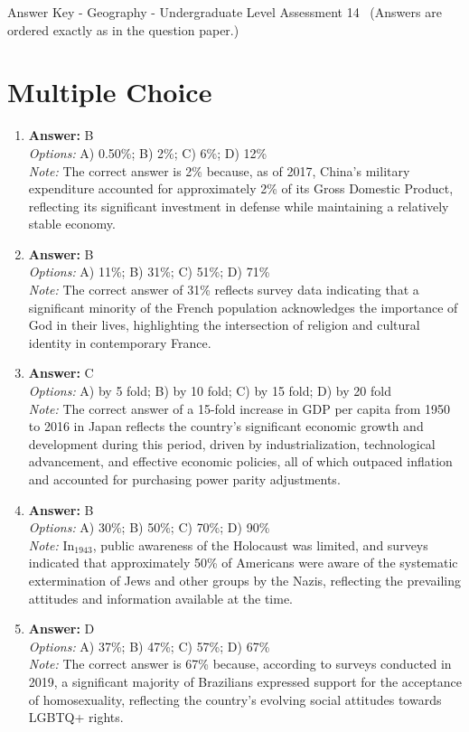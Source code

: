 \documentclass[12pt]{article}
\begin{document}
\begin{center}
Answer Key - Geography - Undergraduate Level Assessment 14 \
\small (Answers are ordered exactly as in the question paper.)
\end{center}

\section*{Multiple Choice}
\begin{enumerate}[label=\arabic*.]
\item \textbf{Answer:} B
\\ \textit{Options:} A) 0.50\%; B) 2\%; C) 6\%; D) 12\%
\\ \textit{Note:} The correct answer is 2\% because, as of 2017, China's military expenditure accounted for approximately 2\% of its Gross Domestic Product, reflecting its significant investment in defense while maintaining a relatively stable economy.
\item \textbf{Answer:} B
\\ \textit{Options:} A) 11\%; B) 31\%; C) 51\%; D) 71\%
\\ \textit{Note:} The correct answer of 31\% reflects survey data indicating that a significant minority of the French population acknowledges the importance of God in their lives, highlighting the intersection of religion and cultural identity in contemporary France.
\item \textbf{Answer:} C
\\ \textit{Options:} A) by 5 fold; B) by 10 fold; C) by 15 fold; D) by 20 fold
\\ \textit{Note:} The correct answer of a 15-fold increase in GDP per capita from 1950 to 2016 in Japan reflects the country's significant economic growth and development during this period, driven by industrialization, technological advancement, and effective economic policies, all of which outpaced inflation and accounted for purchasing power parity adjustments.
\item \textbf{Answer:} B
\\ \textit{Options:} A) 30\%; B) 50\%; C) 70\%; D) 90\%
\\ \textit{Note:} In$_{1943}$, public awareness of the Holocaust was limited, and surveys indicated that approximately 50\% of Americans were aware of the systematic extermination of Jews and other groups by the Nazis, reflecting the prevailing attitudes and information available at the time.
\item \textbf{Answer:} D
\\ \textit{Options:} A) 37\%; B) 47\%; C) 57\%; D) 67\%
\\ \textit{Note:} The correct answer is 67\% because, according to surveys conducted in 2019, a significant majority of Brazilians expressed support for the acceptance of homosexuality, reflecting the country's evolving social attitudes towards LGBTQ+ rights.
\end{enumerate}
\end{document}
